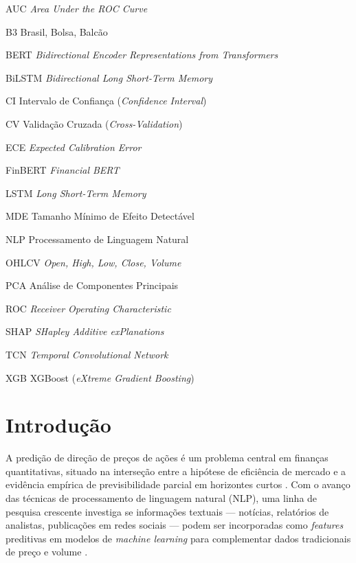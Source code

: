 \documentclass[
    12pt,
    openright,
    oneside,
    a4paper,
    english,
    brazil
]{abntex2}
\begin{document}
\begin{siglas}
    \item[AUC] \textit{Area Under the ROC Curve}
    \item[B3] Brasil, Bolsa, Balcão
    \item[BERT] \textit{Bidirectional Encoder Representations from Transformers}
    \item[BiLSTM] \textit{Bidirectional Long Short-Term Memory}
    \item[CI] Intervalo de Confiança (\textit{Confidence Interval})
    \item[CV] Validação Cruzada (\textit{Cross-Validation})
    \item[ECE] \textit{Expected Calibration Error}
    \item[FinBERT] \textit{Financial BERT}
    \item[LSTM] \textit{Long Short-Term Memory}
    \item[MDE] Tamanho Mínimo de Efeito Detectável
    \item[NLP] Processamento de Linguagem Natural
    \item[OHLCV] \textit{Open, High, Low, Close, Volume}
    \item[PCA] Análise de Componentes Principais
    \item[ROC] \textit{Receiver Operating Characteristic}
    \item[SHAP] \textit{SHapley Additive exPlanations} \cite{lundberg2017}
    \item[TCN] \textit{Temporal Convolutional Network}
    \item[XGB] XGBoost (\textit{eXtreme Gradient Boosting})
\end{siglas}

\tableofcontents*
\cleardoublepage

\textual

\chapter{Introdução}\label{cap:introducao}

A predição de direção de preços de ações é um problema central em finanças quantitativas, situado na interseção entre a hipótese de eficiência de mercado \cite{fama1970} e a evidência empírica de previsibilidade parcial em horizontes curtos \cite{lo2004}. Com o avanço das técnicas de processamento de linguagem natural (NLP), uma linha de pesquisa crescente investiga se informações textuais --- notícias, relatórios de analistas, publicações em redes sociais --- podem ser incorporadas como \textit{features} preditivas em modelos de \textit{machine learning} para complementar dados tradicionais de preço e volume \cite{xu2018,araci2019}.
\end{document}
